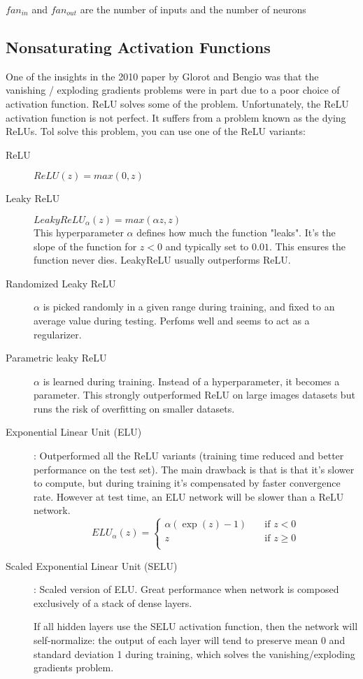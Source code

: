 \documentclass[french]{article}
\begin{document}
$fan_{in}$ and $fan_{out}$ are the number of inputs and the number of neurons

\subsection{Nonsaturating Activation Functions}

One of the insights in the 2010 paper by Glorot and Bengio was that the vanishing / exploding gradients problems were in part due to a poor choice of activation function. ReLU solves some of the problem. Unfortunately, the ReLU activation function is not perfect. It suffers from a problem known as the dying ReLUs. Tol solve this problem, you can use one of the ReLU variants:

\begin{description}
    \item[ReLU] $ReLU(z) = max(0, z)$
    \item[Leaky ReLU] $LeakyReLU_\alpha(z) = max(\alpha z, z)$\\
        This hyperparameter $\alpha$ defines how much the function "leaks". It's the slope of the function for $z < 0$ and typically set to $0.01$. This ensures the function never dies. LeakyReLU usually outperforms ReLU.
    \item[Randomized Leaky ReLU] $\alpha$ is picked randomly in a given range during training, and fixed to an average value during testing. Perfoms well and seems to act as a regularizer.
    \item[Parametric leaky ReLU] $\alpha$ is learned during training. Instead of a hyperparameter, it becomes a parameter. This strongly outperformed ReLU on large images datasets but runs the risk of overfitting on smaller datasets.
    \item[Exponential Linear Unit (ELU)]: Outperformed all the ReLU variants (training time reduced and better performance on the test set). The main drawback is that is that it's slower to compute, but during training it's compensated by faster convergence rate. However at test time, an ELU network will be slower than a ReLU network.
      \[   
      ELU_{\alpha}(z) =
           \begin{cases}
             \alpha (\exp(z) - 1)  &\quad\text{if } z < 0\\
             z &\quad\text{if } z \geq 0 \\
           \end{cases}
      \]
    \item[Scaled Exponential Linear Unit (SELU)]: Scaled version of ELU. Great performance when network is composed exclusively of a stack of dense layers.

    If all hidden layers use the SELU activation function, then the network will self-normalize: the output of each layer will tend to preserve mean 0 and standard deviation 1 during training, which solves the vanishing/exploding gradients problem.
\end{description}
\end{document}
